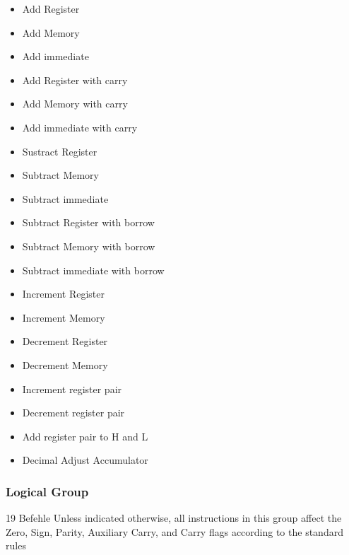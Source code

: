 \documentclass[12pt]{article}
\begin{document}
\begin{multicols}{2}
\begin{itemize}
\item Add Register
\item Add Memory
\item Add immediate
\item Add Register with carry
\item Add Memory with carry
\item Add immediate with carry
\item Sustract Register
\item Subtract Memory
\item Subtract immediate
\item Subtract Register with borrow
\item Subtract Memory with borrow
\item Subtract immediate with borrow
\item Increment Register
\item Increment Memory
\item Decrement Register
\item Decrement Memory
\item Increment register pair
\item Decrement register pair
\item Add register pair to H and L
\item Decimal Adjust Accumulator
\end{itemize}
\end{multicols}

\subsubsection{Logical Group}
19 Befehle
Unless indicated otherwise, all instructions in this
group affect the Zero, Sign, Parity, Auxiliary Carry, and
Carry flags according to the standard rules
\end{document}
